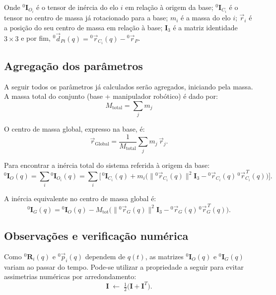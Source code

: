 Onde ${}^{0}\mathbf{I}_{O_i}$ é o tensor de inércia do elo $i$ em relação à origem da base;
${}^{0}\mathbf{I}_{C_i}$ é o tensor no centro de massa já rotacionado para a base;
$m_i$ é a massa do elo $i$;
$\vec r_i$ é a posição do seu centro de massa em relação à base;
$\mathbf{I}_3$ é a matriz identidade $3\times 3$ e por fim,
${}^{0}\!\vec d_{Pi}(q)= {}^{0}\!\vec r_{C_i}(q)-{}^{0}\!\vec r_{P}$.


\subsection{Agregação dos parâmetros}
A seguir todos os parâmetros já calculados serão agregados, iniciando pela massa.
A massa total do conjunto (base + manipulador robótico) é dado por:
\begin{equation}
  M_{\text{total}} = \sum_{j} m_j
\end{equation}

O centro de massa global, expresso na base, é:
\begin{equation}
  \vec{r}_{\text{Global}} = \frac{1}{M_{\text{total}}} \sum_{j} m_j \,\vec{r}_j .
\end{equation}

Para encontrar a inércia total do sistema referida à origem da base:
\begin{equation}
{}^{0}\!\mathbf I_{O}(q)=\sum_{i} {}^{0}\!\mathbf I_{O_i}(q)
=\sum_{i}\Big[\,{}^{0}\!\mathbf I_{C_i}(q)+ m_i\big(\|{}^{0}\!\vec r_{C_i}(q)\|^2\mathbf I_3-{}^{0}\!\vec r_{C_i}(q)\,{}^{0}\!\vec r_{C_i}^{\,T}(q)\big)\Big].
\label{eq:I_total_O}
\end{equation}

A inércia equivalente no centro de massa global é:
\begin{equation}
{}^{0}\!\mathbf I_{G}(q)
= {}^{0}\!\mathbf I_{O}(q)
- M_{\mathrm{tot}}\big(\|{}^{0}\!\vec r_{G}(q)\|^2\mathbf I_3-{}^{0}\!\vec r_{G}(q)\,{}^{0}\!\vec r_{G}^{\,T}(q)\big).
\label{eq:I_total_G}
\end{equation}

\subsection{Observações e verificação numérica}
Como ${}^{0}\!\mathbf R_i(q)$ e ${}^{0}\!\vec p_i(q)$ dependem de $q(t)$, as matrizes \({}^{0}\!\mathbf I_{O}(q)\) e \({}^{0}\!\mathbf I_{G}(q)\) variam ao passar do tempo.
Pode-se utilizar a propriedade a seguir para evitar assimetrias numéricas por arredondamento:
\begin{equation}
\mathbf I \;\leftarrow\; \tfrac{1}{2}\big(\mathbf I+\mathbf I^{T}\big).
\label{eq:symmetrize}
\end{equation}

